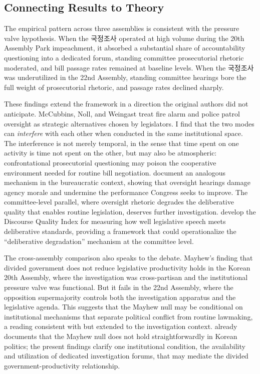 \documentclass[11pt]{article}
\begin{document}
\subsection{Connecting Results to Theory}

The empirical pattern across three assemblies is consistent with the pressure valve hypothesis. When the 국정조사 operated at high volume during the 20th Assembly Park impeachment, it absorbed a substantial share of accountability questioning into a dedicated forum, standing committee prosecutorial rhetoric moderated, and bill passage rates remained at baseline levels. When the 국정조사 was underutilized in the 22nd Assembly, standing committee hearings bore the full weight of prosecutorial rhetoric, and passage rates declined sharply.

These findings extend the \citet{mccubbins1989} framework in a direction the original authors did not anticipate. McCubbins, Noll, and Weingast treat fire alarm and police patrol oversight as strategic alternatives chosen by legislators. I find that the two modes can \textit{interfere} with each other when conducted in the same institutional space. The interference is not merely temporal, in the sense that time spent on one activity is time not spent on the other, but may also be atmospheric: confrontational prosecutorial questioning may poison the cooperative environment needed for routine bill negotiation. \citet{marvel2015} document an analogous mechanism in the bureaucratic context, showing that oversight hearings damage agency morale and undermine the performance Congress seeks to improve. The committee-level parallel, where oversight rhetoric degrades the deliberative quality that enables routine legislation, deserves further investigation. \citet{steiner2004} develop the Discourse Quality Index for measuring how well legislative speech meets deliberative standards, providing a framework that could operationalize the ``deliberative degradation'' mechanism at the committee level.

The cross-assembly comparison also speaks to the \citet{mayhew1991} debate. Mayhew's finding that divided government does not reduce legislative productivity holds in the Korean 20th Assembly, where the investigation was cross-partisan and the institutional pressure valve was functional. But it fails in the 22nd Assembly, where the opposition supermajority controls both the investigation apparatus and the legislative agenda. This suggests that the Mayhew null may be conditional on institutional mechanisms that separate political conflict from routine lawmaking, a reading consistent with \citet{edwards1997} but extended to the investigation context. \citet{lee2012} already documents that the Mayhew null does not hold straightforwardly in Korean politics; the present findings clarify one institutional condition, the availability and utilization of dedicated investigation forums, that may mediate the divided government-productivity relationship.
\end{document}

